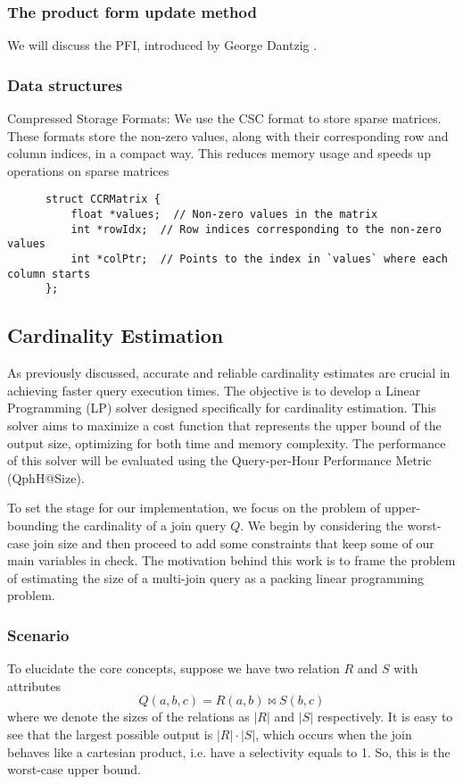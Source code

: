   \subsubsection*{The product form update method}
  We will discuss the PFI, introduced by George Dantzig \parencite{dantzig1954product}.
  \subsubsection*{Data structures}
  Compressed Storage Formats:
  We use the CSC format to store sparse matrices. These formats store the non-zero values, along with their corresponding row and column indices, 
  in a compact way. This reduces memory usage and speeds up operations on sparse matrices
  
  \begin{verbatim}
      struct CCRMatrix {
          float *values;  // Non-zero values in the matrix
          int *rowIdx;  // Row indices corresponding to the non-zero values
          int *colPtr;  // Points to the index in `values` where each column starts
      };
  \end{verbatim}
\subsection{Cardinality Estimation}
As previously discussed, accurate and 
reliable cardinality estimates are crucial 
in achieving faster query execution times. 
The objective is to develop a Linear Programming (LP) 
solver designed specifically for cardinality estimation. 
This solver aims to maximize a cost function that represents 
the upper bound of the output size, optimizing for both 
time and memory complexity. The performance of this solver 
will be evaluated using the Query-per-Hour Performance Metric 
(QphH@Size).

To set the stage for our implementation, 
we focus on the problem of upper-bounding the 
cardinality of a join query $Q$. 
We begin by considering the worst-case join size and then proceed
to add some constraints that keep some of our main variables in check.
 The motivation behind this work is to frame the problem of 
 estimating the size of a multi-join query as a packing 
 linear programming problem.
\subsubsection{Scenario}
To elucidate the core concepts, 
suppose we have two relation $R$ and $S$ with attributes 
\[
Q(a, b, c) = R(a, b) \Join S(b, c)
\]
where we denote the sizes of the relations as
$|R|$ and $|S|$ respectively.
It is easy to see that the largest possible output is $|R| \cdot |S|$, which occurs when the join
behaves like a cartesian product, i.e. have a selectivity equals to 1. So, this is the worst-case
upper bound.


